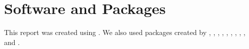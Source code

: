 \documentclass[11pt,a4paper,]{article}
\begin{document}
\section*{Software and Packages}

This report was created using \textcite{Rcore}. We also used packages created by \textcite{ggresidpanel}, \textcite{broom}, \textcite{tidyverse}, \textcite{lubridate}, \textcite{janitor}, \textcite{knitr}, \textcite{kableextra}, \textcite{bookdown}, \textcite{ggmap}, and \textcite{ggthemes}.

\printbibliography
\end{document}
